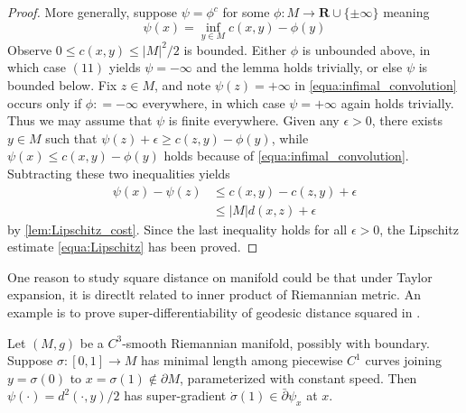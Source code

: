 \begin{proof}
	More generally, suppose \( \psi = \phi ^ { c } \) for some \( \phi : M \rightarrow \mathbf { R } \cup \{ \pm \infty \} \) meaning
	\begin{equation}
		\label{equa:infimal_convolution}
		\psi ( x ) = \inf _ { y \in M } c ( x , y ) - \phi ( y )
	\end{equation}
	Observe \( 0 \leq c ( x , y ) \leq | M | ^ { 2 } / 2 \) is bounded.
	Either \( \phi \) is unbounded above, in which case \( ( 11 ) \) yields \( \psi = - \infty \) and the lemma holds trivially, or else \( \psi \) is bounded below.
	Fix \( z \in M \), and note \( \psi ( z ) = + \infty \) in \cref{equa:infimal_convolution} occurs only if \( \phi : = - \infty \) everywhere, in which case \( \psi = + \infty \) again holds trivially.
	Thus we may assume that \( \psi \) is finite everywhere.
	Given any \( \epsilon > 0 \), there exists \( y \in M \)
	such that \( \psi ( z ) + \epsilon \geq c ( z , y ) - \phi ( y ) \), while \( \psi ( x ) \leq c ( x , y ) - \phi ( y ) \) holds because of \cref{equa:infimal_convolution}.
	Subtracting these two inequalities yields
	\begin{align*}
		\psi ( x ) - \psi ( z ) & \leq c ( x , y ) - c ( z , y ) + \epsilon \\
		                        & \leq | M | d ( x , z ) + \epsilon
	\end{align*}
	by \cref{lem:Lipschitz_cost}. Since the last inequality holds for all \( \epsilon > 0 \), the Lipschitz
	estimate \cref{equa:Lipschitz} has been proved.
\end{proof}

One reason to study square distance on manifold could be that under Taylor expansion, it is directlt related to inner product of Riemannian metric.
An example is to prove super-differentiability of geodesic distance squared in \cite{mccann2001polar}.

\begin{prop}
	Let \( ( M , g ) \) be a \( C ^ { 3 } \)-smooth Riemannian manifold, possibly with boundary.
	Suppose \( \sigma : [ 0,1 ] \rightarrow M \) has minimal length among piecewise \( C ^ { 1 } \) curves joining \( y = \sigma ( 0 ) \) to \( x = \sigma ( 1 ) \notin \partial M \), parameterized with constant speed.
	Then \( \psi ( \cdot ) = d ^ { 2 } ( \cdot , y ) / 2 \) has super-gradient \( \dot { \sigma } ( 1 ) \in \bar { \partial } \psi _ { x } \) at \( x \).
\end{prop}

